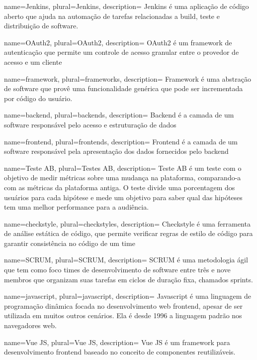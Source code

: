 {
  name=Jenkins,
  plural=Jenkins,
  description={
    Jenkins é uma aplicação de código aberto que ajuda na automação de tarefas relacionadas a build, teste e distribuição de software.
  }
}

{
  name=OAuth2,
  plural=OAuth2,
  description={
    OAuth2 é um framework de autenticação que permite um controle de acesso granular entre o provedor de acesso e um cliente
  }
}

{
  name=framework,
  plural=frameworks,
  description={
    Framework é uma abstração de software que provê uma funcionalidade genérica que pode ser incrementada por código do usuário.
  }
}

{
  name=backend,
  plural=backends,
  description={
    Backend é a camada de um software responsável pelo acesso e estruturação de dados
  }
}

{
  name=frontend,
  plural=frontends,
  description={
    Frontend é a camada de um software responsável pela apresentação dos dados fornecidos pelo \gls{backend}
  }
}

{
  name=Teste AB,
  plural=Testes AB,
  description={
    Teste AB é um teste com o objetivo de medir métricas sobre uma mudança na plataforma, comparando-a com as métricas da plataforma antiga. O teste divide uma porcentagem dos usuários para cada hipótese e mede um objetivo para saber qual das hipóteses tem uma melhor performance para a audiência.
  }
}

{
  name=checkstyle,
  plural=checkstyles,
  description={
    Checkstyle é uma ferramenta de análise estática de código, que permite verificar regras de estilo de código para garantir consistência no código de um time
  }
}

{
  name=SCRUM,
  plural=SCRUM,
  description={
    SCRUM é uma metodologia ágil que tem como foco times de desenvolvimento de software entre três e nove membros que organizam suas tarefas em ciclos de duração fixa, chamados sprints.
  }
}

{
  name=javascript,
  plural=javascript,
  description={
    Javascript é uma linguagem de programação dinâmica focada no desenvolvimento web \gls{frontend}, apesar de ser utilizada em muitos outros cenários. Ela é desde 1996 a linguagem padrão nos navegadores web.
  }
}

{
  name=Vue JS,
  plural=Vue JS,
  description={
    Vue JS é um \gls{framework} para desenvolvimento \gls{frontend} baseado no conceito de componentes reutilizáveis.
  }
}

